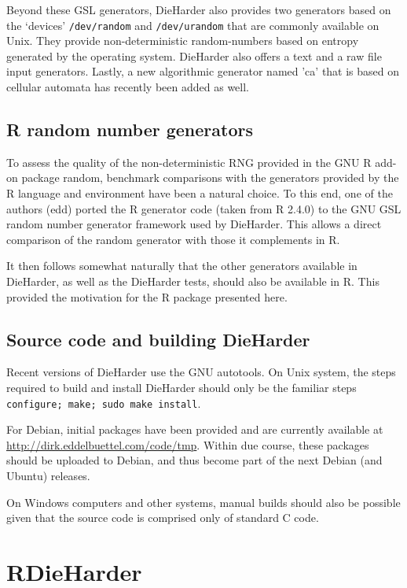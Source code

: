 \documentclass[12pt]{article}
\newcommand{\pkg}[1]{{\normalfont\fontseries{b}\selectfont #1}}
\begin{document}
Beyond these GSL generators, DieHarder also provides two generators based on
the `devices' \texttt{/dev/random} and \texttt{/dev/urandom} that are
commonly available on Unix. They provide non-deterministic random-numbers
based on entropy generated by the operating system. DieHarder also offers a
text and a raw file input generators. Lastly, a new algorithmic generator
named 'ca' that is based on cellular automata has recently been added as well.

\subsection{R random number generators}

To assess the quality of the non-deterministic RNG provided in the GNU R
add-on package \pkg{random}, benchmark comparisons with the generators
provided by the R language and environment have been a natural choice. To
this end, one of the authors (edd) ported the R generator code (taken from R
2.4.0) to the GNU GSL random number generator framework used by DieHarder.
 This allows a direct comparison
of the \pkg{random} generator with those it complements in R.

It then follows somewhat naturally that the other generators available in
DieHarder, as well as the DieHarder tests, should also be available in R.
This provided the motivation for the R package presented here.

\subsection{Source code and building DieHarder} 

Recent versions of DieHarder use the GNU autotools. On Unix system,
the steps required to build and install DieHarder should only be the familiar
steps \texttt{configure; make; sudo make install}. 

For Debian, initial packages have been provided and are currently available
at \url{http://dirk.eddelbuettel.com/code/tmp}.  Within due course, these
packages should be uploaded to Debian, and thus become part of the next
Debian (and Ubuntu) releases.

On Windows computers and other systems, manual builds should also be possible
given that the source code is comprised only of standard C code. 

\section{RDieHarder}
\end{document}
